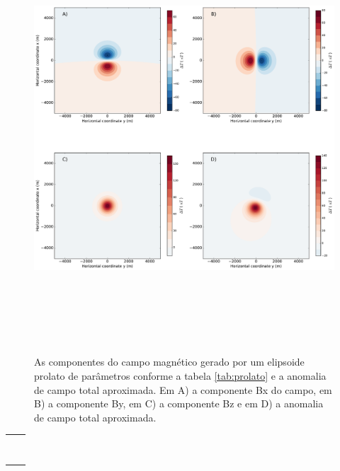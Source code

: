 \begin{figure}[hbt!]
	\centering \includegraphics[width=16cm,height=16cm]{figures/ellipsoid_prolate}
	\caption[As componentes do campo magnético gerado por um elipsoide prolato e a anomalia de campo total aproximada.]{As componentes 
		do campo magnético gerado por um elipsoide prolato de parâmetros conforme a tabela \ref{tab:prolato} e a anomalia de campo total aproximada. Em A) a componente Bx do campo, em B) a componente By, em C) a componente Bz e em D) a anomalia de campo total aproximada.}
	\label{fig:prolate}
\end{figure}

\begin{table}[h!]
	\begin{center}
		\begin{tabular}{lc}
			
			&  \\
			& \\
			& \\
			& \\
			& \\
			& \\ 
			& \\
			& \\
		\end{tabular}
	\end{center}
\end{table}

